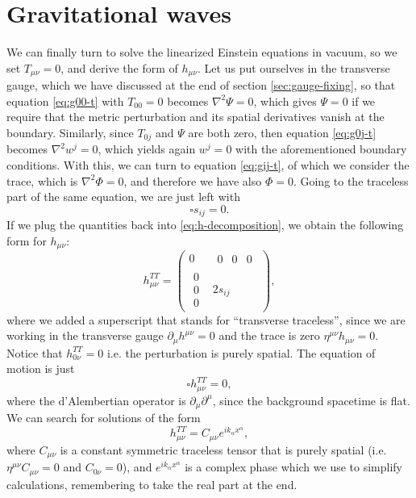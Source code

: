 \documentclass[a4paper]{article}
\begin{document}
\section{Gravitational waves}
We can finally turn to solve the linearized Einstein equations in vacuum, so we set $T_{\mu\nu} = 0$, and derive the form of $h_{\mu\nu}$.
Let us put ourselves in the transverse gauge, which we have discussed at the end of section \ref{sec:gauge-fixing}, so that equation \eqref{eq:g00-t} with $T_{00}=0$ becomes $\nabla^2\Psi = 0$, which gives $\Psi = 0$ if we require that the metric perturbation and its spatial derivatives vanish at the boundary.
Similarly, since $T_{0j}$ and $\Psi$ are both zero, then equation \eqref{eq:g0j-t} becomes $\nabla^2 w^j = 0$, which yields again $w^j=0$ with the aforementioned boundary conditions. With this, we can turn to equation \eqref{eq:gij-t}, of which we consider the trace, which is $\nabla^2\Phi = 0$, and therefore we have also $\Phi = 0$. Going to the traceless part of the same equation, we are just left with
\begin{equation}
  \square s_{ij} = 0.
\end{equation}
If we plug the quantities back into \eqref{eq:h-decomposition}, we obtain the following form for $h_{\mu\nu}$:
\begin{equation}
  h^{TT}_{\mu\nu} = \begin{pmatrix}
    0 & \begin{matrix}0 & 0 & 0\end{matrix}\\
    \begin{matrix}
      0\\
      0\\
      0
    \end{matrix}& 2s_{ij}
  \end{pmatrix},
\end{equation}
where we added a superscript that stands for ``transverse traceless'', since we are working in the transverse gauge $\partial_{\mu}h^{\mu\nu} = 0$ and the trace is zero $\eta^{\mu\nu}h_{\mu\nu} = 0$. Notice that $h^{TT}_{0\nu} = 0$ i.e. the perturbation is purely spatial.
The equation of motion is just
\begin{equation}
  \square h^{TT}_{\mu\nu} = 0,
  \label{eq:wave-eq}
\end{equation} 
where the d'Alembertian operator is $\partial_{\mu}\partial^{\mu}$, since the background spacetime is flat.
We can search for solutions of the form
\begin{equation}
  h^{TT}_{\mu\nu} = C_{\mu\nu}e^{ik_{\alpha}x^{\alpha}},
  \label{eq:ansatz}
\end{equation}
where $C_{\mu\nu}$ is a constant symmetric traceless tensor that is purely spatial (i.e. $\eta^{\mu\nu}C_{\mu\nu} = 0$ and $C_{0\nu} = 0$), and $e^{ik_{\alpha}x^{\alpha}}$ is a complex phase which we use to simplify calculations, remembering to take the real part at the end.
\end{document}
